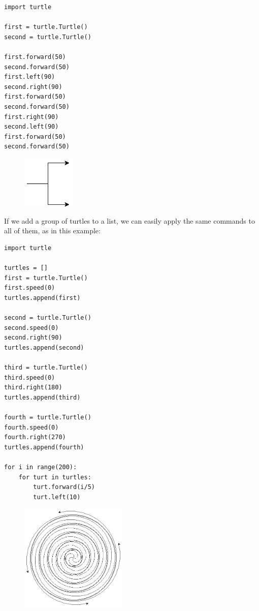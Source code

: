 \documentclass[11pt]{cselabheader}
\begin{document}
\begin{lstlisting}[style=python]
import turtle

first = turtle.Turtle()
second = turtle.Turtle()

first.forward(50)
second.forward(50)
first.left(90)
second.right(90)
first.forward(50)
second.forward(50)
first.right(90)
second.left(90)
first.forward(50)
second.forward(50)
\end{lstlisting}

\begin{figure}[h]
  \centering
  \includegraphics[width=1.0in]{img/turtle_prong}
\end{figure}

If we add a group of turtles to a list, we can easily apply the same commands to all of them, as in this example:

\begin{lstlisting}[style=python]
import turtle

turtles = []
first = turtle.Turtle()
first.speed(0)
turtles.append(first)

second = turtle.Turtle()
second.speed(0)
second.right(90)
turtles.append(second)

third = turtle.Turtle()
third.speed(0)
third.right(180)
turtles.append(third)

fourth = turtle.Turtle()
fourth.speed(0)
fourth.right(270)
turtles.append(fourth)

for i in range(200):
    for turt in turtles:
        turt.forward(i/5)
        turt.left(10)
\end{lstlisting}

\begin{figure}[h]
  \centering
  \includegraphics[width=2.0in]{img/fancy_spiral}
\end{figure}
\end{document}
